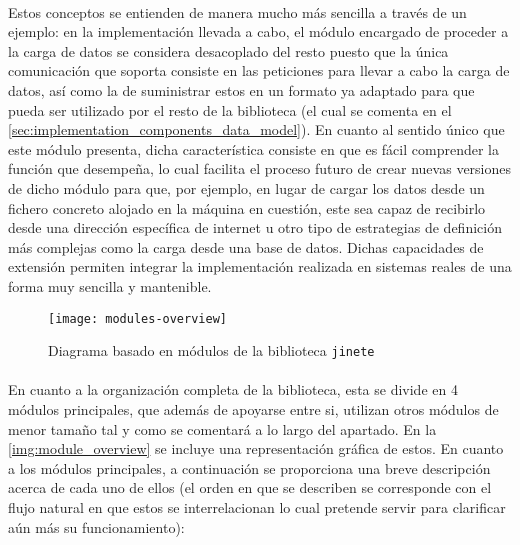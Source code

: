 \documentclass{subfiles}
\begin{document}
          \paragraph{}
          Estos conceptos se entienden de manera mucho más sencilla a través de un ejemplo: en la implementación llevada a cabo, el módulo encargado de proceder a la carga de datos se considera desacoplado del resto puesto que la única comunicación que soporta consiste en las peticiones para llevar a cabo la carga de datos, así como la de suministrar estos en un formato ya adaptado para que pueda ser utilizado por el resto de la biblioteca (el cual se comenta en el \cref{sec:implementation_components_data_model}). En cuanto al sentido único que este módulo presenta, dicha característica consiste en que es fácil comprender la función que desempeña, lo cual facilita el proceso futuro de crear nuevas versiones de dicho módulo para que, por ejemplo, en lugar de cargar los datos desde un fichero concreto alojado en la máquina en cuestión, este sea capaz de recibirlo desde una dirección específica de internet u otro tipo de estrategias de definición más complejas como la carga desde una base de datos. Dichas capacidades de extensión permiten integrar la implementación realizada en sistemas reales de una forma muy sencilla y mantenible.
          
          \begin{figure}[ht]
            \centering
            \texttt{[image: modules-overview]}
            \caption{Diagrama basado en módulos de la biblioteca \texttt{jinete}}
            \label{img:modules_overview}
          \end{figure}
          
          \paragraph{}
          En cuanto a la organización completa de la biblioteca, esta se divide en 4 módulos principales, que además de apoyarse entre si, utilizan otros módulos de menor tamaño tal y como se comentará a lo largo del apartado. En la \cref{img:module_overview} se incluye una representación gráfica de estos. En cuanto a los módulos principales, a continuación se proporciona una breve descripción acerca de cada uno de ellos (el orden en que se describen se corresponde con el flujo natural en que estos se interrelacionan lo cual pretende servir para clarificar aún más su funcionamiento):
\end{document}
